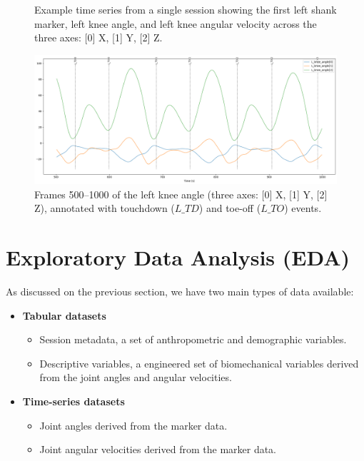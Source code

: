 \begin{figure}[ht]
\begin{minipage}[t]{0.48\textwidth}
        \caption{Example time series from a single session showing the first left shank marker, left knee angle, and left knee angular velocity across the three axes: [0] X, [1] Y, [2] Z.}
        \label{fig:data-ext-marker-velo-angle-ts}
    \end{minipage}
\end{figure}

\begin{figure}[ht]
    \centering
    \includegraphics[width=0.5\columnwidth]{images/ex_l_knee_angle_events.png}
    \caption{Frames 500--1000 of the left knee angle (three axes: [0] X, [1] Y, [2] Z), annotated with touchdown (\(L\_TD\)) and toe-off (\(L\_TO\)) events.}
    \label{fig:data-ext-l-knee-angle-events}
\end{figure}



\section{Exploratory Data Analysis (EDA)}\label{sec:method-eda}
As discussed on the previous section, we have two main types of data available:

\begin{itemize}
    \item \textbf{Tabular datasets}
    \begin{itemize}
        \item Session metadata, a set of anthropometric and demographic variables.
        \item Descriptive variables, a engineered set of biomechanical variables derived from the joint angles and angular velocities.
    \end{itemize}
    \item \textbf{Time-series datasets}
    \begin{itemize}
        \item Joint angles derived from the marker data.
        \item Joint angular velocities derived from the marker data.
    \end{itemize}
\end{itemize}

